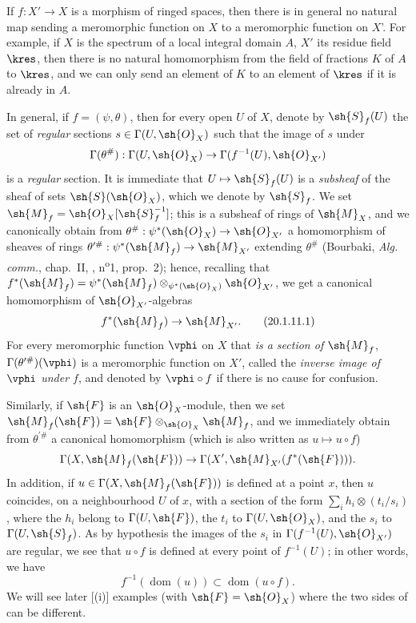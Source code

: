 \begin{env}[20.1.11]
\label{IV.20.1.11}
If $f:X'\to X$ is a morphism of ringed spaces, then there is in general no natural map sending a meromorphic function on $X$ to a meromorphic function on $X$'.
For example, if $X$ is the spectrum of a local integral domain $A$, $X'$ its residue field $\kres$, then there is no natural homomorphism from the field of fractions $K$ of $A$ to $\kres$, and we can only send an element of $K$ to an element of $\kres$ if it is already in $A$.

In general, if $f=(\psi,\theta)$, then for every open $U$ of $X$, denote by $\sh{S}_f(U)$ the set of \emph{regular} sections $s\in\Gamma(U,\sh{O}_X)$ such that the image of $s$ under
\[
  \Gamma(\theta^\#):\Gamma(U,\sh{O}_X)\to\Gamma(f^{-1}(U),\sh{O}_{X'})
\]
is a \emph{regular} section.
It is immediate that $U\mapsto\sh{S}_f(U)$ is a \emph{subsheaf} of the sheaf of sets $\sh{S}(\sh{O}_X)$, which we denote by $\sh{S}_f$.
We set $\sh{M}_f=\sh{O}_X[\sh{S}_f^{-1}]$;
this is a subsheaf
of rings of $\sh{M}_X$, and we canonically obtain from $\theta^\#:\psi^*(\sh{O}_X)\to\sh{O}_{X'}$ a homomorphism of sheaves of rings $\theta^{\prime\#}:\psi^*(\sh{M}_f)\to\sh{M}_{X'}$ extending $\theta^\#$ (Bourbaki, \emph{Alg. comm.}, chap.~II, , n\textsuperscript{o}1, prop.~2);
hence, recalling that $f^*(\sh{M}_f)=\psi^*(\sh{M}_f)\otimes_{\psi^*(\sh{O}_X)}\sh{O}_{X'}$,
we get a canonical homomorphism of $\sh{O}_{X'}$-algebras
\[
\label{IV.20.1.11.1}
  f^*(\sh{M}_f)\to\sh{M}_{X'}.
  \tag{20.1.11.1}
\]
For every meromorphic function $\vphi$ on $X$ that \emph{is a section of $\sh{M}_f$}, $\Gamma(\theta^{\prime\#})(\vphi)$ is a meromorphic function on $X'$, called the \emph{inverse image of $\vphi$ under $f$}, and denoted by $\vphi\circ f$ if there is no cause for confusion.

Similarly, if $\sh{F}$ is an $\sh{O}_X$-module, then we set $\sh{M}_f(\sh{F})=\sh{F}\otimes_{\sh{O}_X}\sh{M}_f$, and we immediately obtain from $\theta^{\prime\#}$ a canonical homomorphism (which is also written as $u\mapsto u\circ f$)
\[
  \Gamma(X,\sh{M}_f(\sh{F}))\to\Gamma(X',\sh{M}_{X'}(f^*(\sh{F}))).
\]
In addition, if $u\in\Gamma(X,\sh{M}_f(\sh{F}))$ is defined  at a point $x$, then $u$ coincides, on a neighbourhood $U$ of $x$, with a section of the form $\sum_i h_i\otimes(t_i/s_i)$, where the $h_i$ belong to $\Gamma(U,\sh{F})$, the $t_i$ to $\Gamma(U,\sh{O}_X)$, and the $s_i$ to $\Gamma(U,\sh{S}_f)$.
As by hypothesis the images of the $s_i$ in $\Gamma(f^{-1}(U),\sh{O}_{X'})$ are regular, we see that $u\circ f$ is defined at every point of $f^{-1}(U)$;
in other words, we have
\[
\label{IV.20.1.11.2}
  f^{-1}(\operatorname{dom}(u))\subset\operatorname{dom}(u\circ f).
  \tag{20.1.11.2}
\]
We will see later [(i)] examples (with $\sh{F}=\sh{O}_X$) where the two sides of  can be different.


\end{env}
